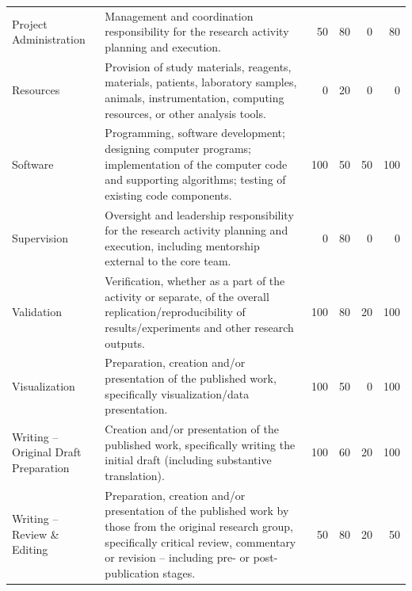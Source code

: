 \documentclass[a4paper,twoside=true,openright,parskip=full,chapterprefix=true,11pt,headings=normal,bibliography=totoc,listof=totoc,titlepage=on,captions=tableabove,draft=false]{scrreprt}
\theoremstyle{definition}
\theoremstyle{definition}
\theoremstyle{definition}
\theoremstyle{remark}
\begin{document}
\begin{table}
\begin{tabular}[t]{llrrrr}
Project Administration & Management and coordination responsibility for the research activity planning and execution. & 50 & 80 & 0 & 80\\
Resources & Provision of study materials, reagents, materials, patients, laboratory samples, animals, instrumentation, computing resources, or other analysis tools. & 0 & 20 & 0 & 0\\
Software & Programming, software development; designing computer programs; implementation of the computer code and supporting algorithms; testing of existing code components. & 100 & 50 & 50 & 100\\
Supervision & Oversight and leadership responsibility for the research activity planning and execution, including mentorship external to the core team. & 0 & 80 & 0 & 0\\
\addlinespace
Validation & Verification, whether as a part of the activity or separate, of the overall replication/reproducibility of results/experiments and other research outputs. & 100 & 80 & 20 & 100\\
Visualization & Preparation, creation and/or presentation of the published work, specifically visualization/data presentation. & 100 & 50 & 0 & 100\\
Writing – Original Draft Preparation & Creation and/or presentation of the published work, specifically writing the initial draft (including substantive translation). & 100 & 60 & 20 & 100\\
Writing – Review \& Editing & Preparation, creation and/or presentation of the published work by those from the original research group, specifically critical review, commentary or revision – including pre- or post-publication stages. & 50 & 80 & 20 & 50\\
\bottomrule
\end{tabular}
\end{table}





% 
\end{document}
